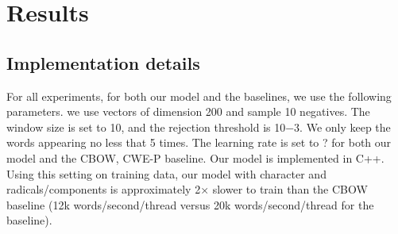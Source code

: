 \section{Results}
\subsection{Implementation details}
For all experiments, for both our model and the baselines, we use the following parameters. we use vectors of dimension 200 and sample 10 negatives. The window size is set to 10, and the rejection threshold is 10−3. We only keep the words appearing no less that 5 times. The learning rate is set to ? for both our model and the CBOW, CWE-P baseline. Our model is implemented in C++.
Using this setting on training data, our model with character and radicals/components is approximately 2× slower to train than the CBOW baseline (12k words/second/thread versus 20k words/second/thread for the baseline). 

